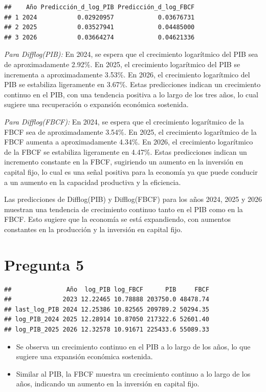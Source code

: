\documentclass[
  12pt,
]{article}
\begin{document}
\begin{verbatim}
##    Año Predicción_d_log_PIB Predicción_d_log_FBCF
## 1 2024           0.02920957            0.03676731
## 2 2025           0.03527941            0.04485000
## 3 2026           0.03664274            0.04621336
\end{verbatim}

\emph{Para Difflog(PIB):} En 2024, se espera que el crecimiento
logarítmico del PIB sea de aproximadamente 2.92\%. En 2025, el
crecimiento logarítmico del PIB se incrementa a aproximadamente 3.53\%.
En 2026, el crecimiento logarítmico del PIB se estabiliza ligeramente en
3.67\%. Estas predicciones indican un crecimiento continuo en el PIB,
con una tendencia positiva a lo largo de los tres años, lo cual sugiere
una recuperación o expansión económica sostenida.

\emph{Para Difflog(FBCF):} En 2024, se espera que el crecimiento
logarítmico de la FBCF sea de aproximadamente 3.54\%. En 2025, el
crecimiento logarítmico de la FBCF aumenta a aproximadamente 4.34\%. En
2026, el crecimiento logarítmico de la FBCF se estabiliza ligeramente en
4.47\%. Estas predicciones indican un incremento constante en la FBCF,
sugiriendo un aumento en la inversión en capital fijo, lo cual es una
señal positiva para la economía ya que puede conducir a un aumento en la
capacidad productiva y la eficiencia.

Las predicciones de Difflog(PIB) y Difflog(FBCF) para los años 2024,
2025 y 2026 muestran una tendencia de crecimiento continuo tanto en el
PIB como en la FBCF. Esto sugiere que la economía se está expandiendo,
con aumentos constantes en la producción y la inversión en capital fijo.

\section{Pregunta 5}\label{pregunta-5}

\begin{verbatim}
##               Año  log_PIB log_FBCF      PIB     FBCF
##              2023 12.22465 10.78888 203750.0 48478.74
## last_log_PIB 2024 12.25386 10.82565 209789.2 50294.35
## log_PIB_2024 2025 12.28914 10.87050 217322.6 52601.40
## log_PIB_2025 2026 12.32578 10.91671 225433.6 55089.33
\end{verbatim}

\begin{itemize}
\item
  Se observa un crecimiento continuo en el PIB a lo largo de los años,
  lo que sugiere una expansión económica sostenida.
\item
  Similar al PIB, la FBCF muestra un crecimiento continuo a lo largo de
  los años, indicando un aumento en la inversión en capital fijo.
\end{itemize}
\end{document}
